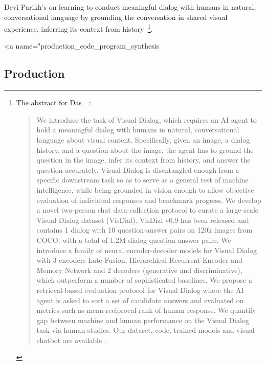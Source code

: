 Devi Parikh's {} on learning to conduct meaningful dialog with humans in natural, conversational language by grounding the conversation in shared visual experience, inferring its context from history~\cite{DasetalCVPR-17}\footnote{%
%
  The abstract for Das~\etal{}~\cite{DasetalCVPR-17}:
%
  \begin{quotation}
%
    We introduce the task of Visual Dialog, which requires an AI agent to hold a meaningful dialog with humans in natural, conversational language about visual content. Specifically, given an image, a dialog history, and a question about the image, the agent has to ground the question in the image, infer its context from history, and answer the question accurately. Visual Dialog is disentangled enough from a specific downstream task so as to serve as a general test of machine intelligence, while being grounded in vision enough to allow objective evaluation of individual responses and benchmark progress. We develop a novel two-person chat data-collection protocol to curate a large-scale Visual Dialog dataset (VisDial). VisDial v0.9 has been released and contains 1 dialog with 10 question-answer pairs on \hmapprox{}120k images from COCO, with a total of \hmapprox{}1.2M dialog question-answer pairs. We introduce a family of neural encoder-decoder models for Visual Dialog with 3 encoders \emdash{} Late Fusion, Hierarchical Recurrent Encoder and Memory Network \emdash{} and 2 decoders (generative and discriminative), which outperform a number of sophisticated baselines. We propose a retrieval-based evaluation protocol for Visual Dialog where the AI agent is asked to sort a set of candidate answers and evaluated on metrics such as mean-reciprocal-rank of human response. We quantify gap between machine and human performance on the Visual Dialog task via human studies. Our dataset, code, trained models and visual chatbot are available {}.
%
  \end{quotation}}.



\rawhtml
<a name="production_code_program_synthesis
\endrawhtml
\subsection*{Production}

